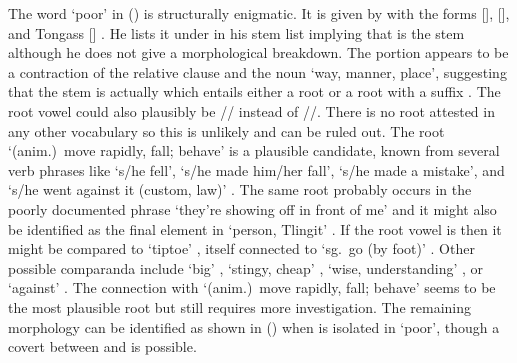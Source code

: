 The word  ‘poor’ in (\lastx) is structurally enigmatic.
It is given by \citeauthor{leer:1973} with the forms  [],  [], and Tongass  [] \parencite[05/87]{leer:1973}.
He lists it under  in his stem list implying that  is the stem \parencite[21]{leer:1978b} although he does not give a morphological breakdown.
The  portion appears to be a contraction of the relative clause  and the noun  ‘way, manner, place’, suggesting that the stem is actually  which entails either a root  or a root  with a suffix .
The root vowel could also plausibly be  // instead of  //.
There is no root  attested in any other vocabulary so this is unlikely and can be ruled out.
The root  ‘(anim.)\ move rapidly, fall; behave’ is a plausible candidate, known from several verb phrases like  ‘s/he fell’,  ‘s/he made him/her fall’,  ‘s/he made a mistake’, and  ‘s/he went against it (custom, law)’ \parencites[f05/91–93]{leer:1973}[658–659]{leer:1976}.
The same root probably occurs in the poorly documented phrase  ‘they’re showing off in front of me’ \parencite[f05/94]{leer:1973} and it might also be identified as the final element in  ‘person, Tlingit’ \parencite[f05/96]{leer:1973}.
If the root vowel is  then it might be compared to  ‘tiptoe’ \parencite[f05/75]{leer:1973}, itself connected to  ‘sg.\ go (by foot)’ \parencite[f05/129]{leer:1973}.
Other possible comparanda include  ‘big’ \parencite[f05/52]{leer:1973},  ‘stingy, cheap’ \parencite[f05/59]{leer:1973},  ‘wise, understanding’ \parencite[f05/61]{leer:1973}, or  ‘against’ \parencite[f05/64]{leer:1973}.
The connection with  ‘(anim.)\ move rapidly, fall; behave’ seems to be the most plausible root but still requires more investigation.
The remaining morphology can be identified as shown in (\lastx) when  is isolated in  ‘poor’, though a covert  between  and  is possible.

